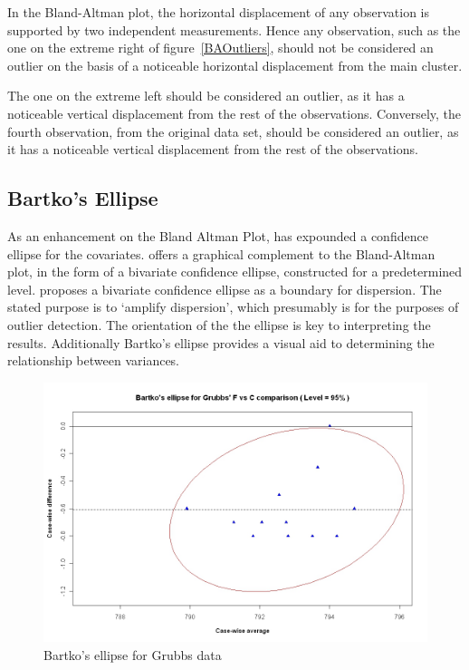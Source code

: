 \documentclass[12pt, a4paper]{report}
\theoremstyle{plain}
\theoremstyle{definition}
\theoremstyle{remark}
\begin{document}
In the Bland-Altman plot, the horizontal displacement of any observation is supported by two independent measurements. Hence any observation, such as the one on the extreme right of figure~\ref{BAOutliers}, should not be considered an outlier on the basis of a noticeable horizontal displacement from the main cluster. 

The one	on the extreme left should be considered an outlier, as it has a noticeable vertical displacement from the rest of the observations. Conversely, the fourth observation, from the original data set, should be considered an outlier, as it has a noticeable vertical displacement from the rest of the observations.








\subsection{Bartko's Ellipse}




As an enhancement on the Bland Altman Plot, \citet{Bartko} has
expounded a confidence ellipse for the covariates. \citet{Bartko} offers a graphical complement to the Bland-Altman
plot, in the form of a bivariate confidence ellipse, constructed for a
predetermined level. \citet{Bartko} proposes
a bivariate confidence ellipse as a boundary for dispersion. The stated purpose is to `amplify dispersion', which presumably is for  the purposes of outlier detection. The orientation of the the ellipse is key to interpreting the results.
Additionally Bartko's ellipse provides a visual aid to determining the
relationship between variances. 



\begin{figure}[h!]
	\includegraphics[width=130mm]{images/GrubbsBartko.jpeg}
	\caption{Bartko's ellipse for Grubbs data}\label{GrubbsBartko}
\end{figure}
\end{document}
